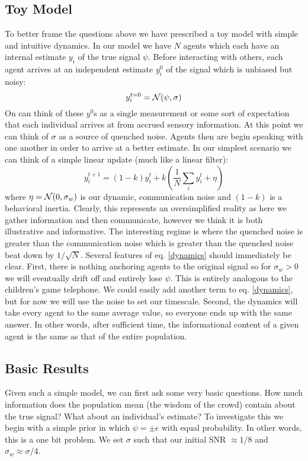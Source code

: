 \documentclass{article}
\newcommand{\N}{{\cal N}}
\newcommand{\be}{\begin{equation}}
\newcommand{\ee}{\end{equation}}
\newcommand{\lp}{\left(}
\newcommand{\rp}{\right)}
\begin{document}


\subsection*{Toy Model}

To better frame the questions above we have prescribed a toy model with simple and intuitive dynamics.  In our model we have $N$ agents which each have an internal estimate $y_i$ of the true signal $\psi$.  Before interacting with others, each agent arrives at an independent estimate $y_i^0$ of the signal which is unbiased but noisy:
\be
y_{i}^{t=0} = \N(\psi,\sigma)
\ee
On can think of these $y^0$s as a single measurement or some sort of expectation that each individual arrives at from accrued sensory information.  At this point we can think of $\sigma$ as a source of quenched noise.  Agents then are begin speaking with one another in order to arrive at a better estimate.  In our simplest scenario we can think of a simple linear update (much like a linear filter):
\be
\label{dynamics}
y_{i}^{t+1} = (1-k)y_i^t + k\lp \frac{1}{N}\sum_{i}{y_{i}^{t}} + \eta \rp
\ee
where $\eta = \N(0,\sigma_{w})$ is our dynamic, communication noise and $(1-k)$ is a behavioral inertia.  Clearly, this represents an oversimplified reality as here we gather information and then communicate, however we think it is both illustrative and informative.  The interesting regime is where the quenched noise is greater than the communication noise which is greater than the quenched noise beat down by $1/\sqrt{N}$.  Several features of eq. \ref{dynamics} should immediately be clear.  First, there is nothing anchoring agents to the original signal so for $\sigma_{w} > 0$ we will eventually drift off and entirely lose $\psi$.  This is entirely analogous to the children's game telephone.   We could easily add another term to eq. \ref{dynamics}, but for now we will use the noise to set our timescale.  Second, the dynamics will take every agent to the same average value, so everyone ends up with the same answer.  In other words, after sufficient time, the informational content of a given agent is the same as that of the entire population.

\subsection*{Basic Results}

Given such a simple model, we can first ask some very basic questions.  How much information does the population mean (the wisdom of the crowd) contain about the true signal?  What about an individual's estimate?  To investigate this we begin with a simple prior in which $\psi = \pm \epsilon$ with equal probability.  In other words, this is a one bit problem.  We set $\sigma$ such that our initial SNR $\approx 1/8$ and $\sigma_w \approx \sigma/4$. 
\end{document}
